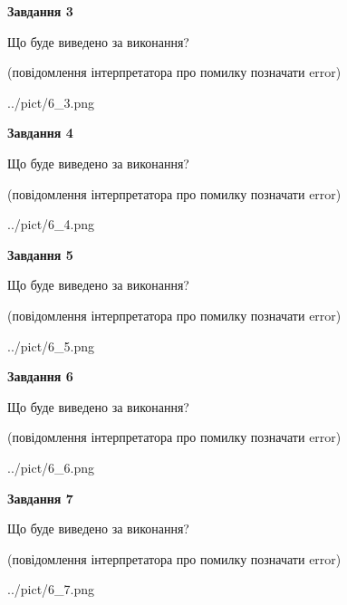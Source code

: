 \documentclass[12pt, ukrainian]{article}
\begin{document}
{\begin {large}
{\begin {center}\textbf{Завдання 3}\end {center}}\par
Що буде виведено за виконання?\par
 (повідомлення інтерпретатора про помилку позначати error)\par
\begin{center}
	{../pict/6_3.png}
\end{center}
\newpage

{\begin {center}\textbf{Завдання 4}\end {center}}\par
Що буде виведено за виконання?\par
 (повідомлення інтерпретатора про помилку позначати error)\par
\begin{center}
	{../pict/6_4.png}
\end{center}
\newpage

{\begin {center}\textbf{Завдання 5}\end {center}}\par
Що буде виведено за виконання?\par
 (повідомлення інтерпретатора про помилку позначати error)\par
\begin{center}
	{../pict/6_5.png}
\end{center}
\newpage

{\begin {center}\textbf{Завдання 6}\end {center}}\par
Що буде виведено за виконання?\par
 (повідомлення інтерпретатора про помилку позначати error)\par
\begin{center}
	{../pict/6_6.png}
\end{center}
\newpage

{\begin {center}\textbf{Завдання 7}\end {center}}\par
Що буде виведено за виконання?\par
 (повідомлення інтерпретатора про помилку позначати error)\par
\begin{center}
	{../pict/6_7.png}
\end{center}
\newpage


\end{large}}
\end{document}
